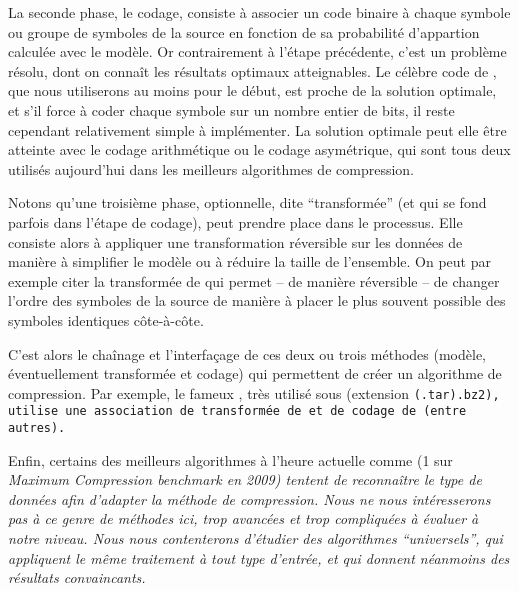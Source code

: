 \documentclass[a4paper, 11pt]{article}
\begin{document}
\vspace{0.2cm}

La seconde phase, le codage, consiste à associer un code binaire à chaque symbole ou groupe de symboles de la source en fonction de sa probabilité d'appartion calculée avec le modèle. Or contrairement à l'étape précédente, c'est un problème résolu, dont on connaît les résultats optimaux atteignables. Le célèbre code de , que nous utiliserons au moins pour le début, est proche de la solution optimale, et s'il force à coder chaque symbole sur un nombre entier de bits, il reste cependant relativement simple à implémenter. La solution optimale peut elle être atteinte avec le codage arithmétique ou le codage asymétrique, qui sont tous deux utilisés aujourd'hui dans les meilleurs algorithmes de compression.

\vspace{0.2cm}

Notons qu'une troisième phase, optionnelle, dite ``transformée'' (et qui se fond parfois dans l'étape de codage), peut prendre place dans le processus. Elle consiste alors à appliquer une transformation réversible sur les données de manière à simplifier le modèle ou à réduire la taille de l'ensemble. On peut par exemple citer la transformée de  qui permet -- de manière réversible -- de changer l'ordre des symboles de la source de manière à placer le plus souvent possible des symboles identiques côte-à-côte.

\vspace{0.2cm}

C'est alors le chaînage et l'interfaçage de ces deux ou trois méthodes (modèle, éventuellement transformée et codage) qui permettent de créer un algorithme de compression. Par exemple, le fameux , très utilisé sous  (extension \tt{\rm{(}.tar\rm{)}.bz2}), utilise une association de transformée de  et de codage de  (entre autres).

\vspace{0.2cm}

Enfin, certains des meilleurs algorithmes à l'heure actuelle comme  (1 sur \it{Maximum Compression benchmark} en 2009) tentent de reconnaître le type de données afin d'adapter la méthode de compression. Nous ne nous intéresserons pas à ce genre de méthodes ici, trop avancées et trop compliquées à évaluer à notre niveau. Nous nous contenterons d'étudier des algorithmes ``universels'', qui appliquent le même traitement à tout type d'entrée, et qui donnent néanmoins des résultats convaincants.
\end{document}
